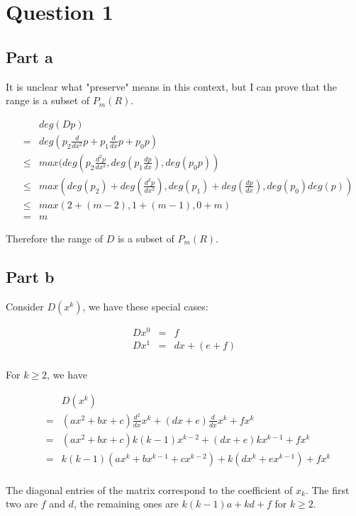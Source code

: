 \section*{Question 1}
\subsection*{Part a}
It is unclear what "preserve" means in this context, but I can prove that the range is a subset of $ P_m(R) $. 

\begin{eqnarray*}
  & & deg(D p) \\
  &=& deg(p_2 \frac{d}{dx^2}p + p_1 \frac{d}{dx}p + p_0 p ) \\
  &\le& max(deg(p_2 \frac{d^2p}{dx^2}, deg(p_1 \frac{dp}{dx}), deg(p_0 p )) \\
  &\le& max(deg(p_2)+deg(\frac{d^2p}{dx^2}), deg(p_1)+deg(\frac{dp}{dx}), deg(p_0)deg(p)) \\
  &\le& max(2+(m-2), 1+(m-1), 0 + m) \\
  &=& m  
\end{eqnarray*}

Therefore the range of $ D $ is a subset of $ P_m(R) $.

\subsection*{Part b}
Consider $ D(x^k) $, we have these special cases:

\begin{eqnarray*}
  D x^0 &=& f \\
  D x^1 &=& dx + (e + f) \\
\end{eqnarray*}

For $ k \ge 2 $, we have

\begin{eqnarray*}
  & & D(x^k) \\
  &=& (ax^2 + bx + c)\frac{d^2}{dx}x^k + (dx + e)\frac{d}{dx}x^k + fx^k \\
  &=& (ax^2 + bx + c)k(k-1)x^{k-2} + (dx + e)kx^{k-1} + fx^k \\
  &=& k(k-1)(ax^k + bx^{k-1} + cx^{k-2}) + k(dx^k + ex^{k-1}) + fx^k \\
\end{eqnarray*}

The diagonal entries of the matrix correspond to the coefficient of $ x_k $. The first two are $ f $ and $ d $, the remaining ones are $ k(k-1)a + kd +f $ for $ k \ge 2 $.
